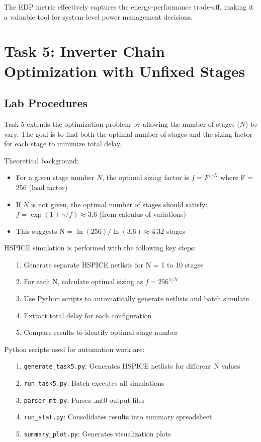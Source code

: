 \documentclass[UTF8,12pt,a4paper]{ctexart}
\begin{document}
The EDP metric effectively captures the energy-performance trade-off, making it a valuable tool for system-level power management decisions.

\newpage
\section{Task 5: Inverter Chain Optimization with Unfixed Stages}

\subsection{Lab Procedures}

Task 5 extends the optimization problem by allowing the number of stages ($N$) to vary. The goal is to find both the optimal number of stages and the sizing factor for each stage to minimize total delay.

Theoretical background:
\begin{itemize}
    \item For a given stage number $N$, the optimal sizing factor is $f = F^{1/N}$ where F = 256 (load factor)
    \item If $N$ is not given, the optimal number of stages should satisfy: $f = \exp(1 + \gamma/f) \approx 3.6$ (from calculus of variations)
    \item This suggests N = $\ln(256)/\ln(3.6) \approx 4.32$ stages
\end{itemize}

HSPICE simulation is performed with the following key steps:
\begin{enumerate}
    \item[1. ] Generate separate HSPICE netlists for N = 1 to 10 stages
    \item[2. ] For each N, calculate optimal sizing as $f = 256^{1/N}$
    \item[3. ] Use Python scripts to automatically generate netlists and batch simulate
    \item[4. ] Extract total delay for each configuration
    \item[5. ] Compare results to identify optimal stage number
\end{enumerate}

Python  scripts used for automation work are:
\begin{itemize}
    \item[1. ] \texttt{generate\_task5.py}: Generates HSPICE netlists for different N values
    \item[2. ] \texttt{run\_task5.py}: Batch executes all simulations
    \item[3. ] \texttt{parser\_mt.py}: Parses .mt0 output files
    \item[4. ] \texttt{run\_stat.py}: Consolidates results into summary spreadsheet
    \item[5. ] \texttt{summary\_plot.py}: Generates visualization plots
\end{itemize}
\end{document}
